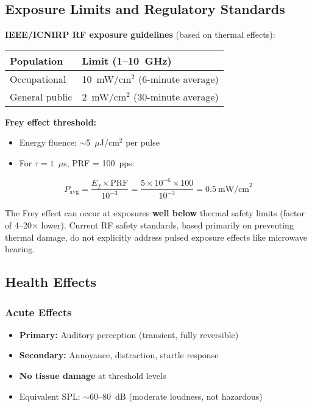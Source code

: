 \subsection{Exposure Limits and Regulatory Standards}

\textbf{IEEE/ICNIRP RF exposure guidelines} (based on thermal effects):

\begin{center}
\begin{tabular}{@{}ll@{}}
\toprule
\textbf{Population} & \textbf{Limit (1--10~GHz)} \\
\midrule
Occupational & 10~mW/cm$^2$ (6-minute average) \\
General public & 2~mW/cm$^2$ (30-minute average) \\
\bottomrule
\end{tabular}
\end{center}

\textbf{Frey effect threshold:}
\begin{itemize}
\item Energy fluence: $\sim$5~$\mu$J/cm$^2$ per pulse
\item For $\tau = 1$~$\mu$s, PRF = 100~pps:
\end{itemize}

\begin{equation}
P_{\text{avg}} = \frac{E_f \times \text{PRF}}{10^{-3}} = \frac{5 \times 10^{-6} \times 100}{10^{-3}} = 0.5~\text{mW/cm}^2
\end{equation}

\begin{keyconcept}
The Frey effect can occur at exposures \textbf{well below} thermal safety limits (factor of 4--20$\times$ lower). Current RF safety standards, based primarily on preventing thermal damage, do not explicitly address pulsed exposure effects like microwave hearing.
\end{keyconcept}

\subsection{Health Effects}

\subsubsection{Acute Effects}
\begin{itemize}
\item \textbf{Primary:} Auditory perception (transient, fully reversible)
\item \textbf{Secondary:} Annoyance, distraction, startle response
\item \textbf{No tissue damage} at threshold levels
\item Equivalent SPL: $\sim$60--80~dB (moderate loudness, not hazardous)
\end{itemize}

